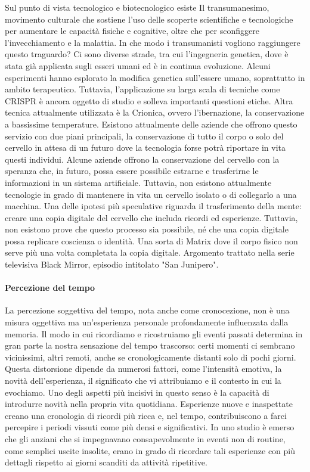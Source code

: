\documentclass[12pt]{book} %
\begin{document}
Sul punto di vista tecnologico e biotecnologico esiste Il transumanesimo, movimento culturale che sostiene l'uso delle scoperte scientifiche e tecnologiche per aumentare le capacità fisiche e cognitive, oltre che per sconfiggere l'invecchiamento e la
malattia. In che modo i transumanisti vogliono raggiungere questo traguardo? Ci sono diverse strade, tra cui
l'ingegneria genetica, dove è stata già applicata sugli esseri umani ed è in continua evoluzione.
Alcuni esperimenti hanno esplorato la modifica genetica sull’essere umano, soprattutto in ambito terapeutico. Tuttavia, l’applicazione su larga scala di tecniche come CRISPR è ancora oggetto di studio e solleva importanti questioni etiche. Altra tecnica attualmente utilizzata è la
Crionica, ovvero l'ibernazione, la conservazione a bassissime temperature. Esistono attualmente
delle aziende che offrono questo servizio con due piani principali, la conservazione di tutto il corpo o solo del
cervello in attesa di un futuro dove la tecnologia forse potrà riportare in vita questi individui. Alcune aziende offrono la conservazione del cervello con la speranza che, in futuro, possa essere possibile estrarne e trasferirne le informazioni in un sistema artificiale. Tuttavia, non esistono attualmente tecnologie in grado di mantenere in vita un cervello isolato o di collegarlo a una macchina. Una delle ipotesi più speculative riguarda il trasferimento della mente: creare una copia digitale del cervello che includa ricordi ed esperienze. Tuttavia, non esistono prove che questo processo sia possibile, né che una copia digitale possa replicare coscienza o identità. Una sorta di Matrix dove il corpo fisico non serve più una
volta completata la copia digitale. Argomento trattato nella serie televisiva Black Mirror, episodio intitolato "San Junipero".

\paragraph{Percezione del tempo}

La percezione soggettiva del tempo, nota anche come cronocezione, non è una misura oggettiva ma un’esperienza personale profondamente influenzata dalla memoria. Il modo in cui ricordiamo e ricostruiamo gli eventi passati determina in gran parte la nostra sensazione del tempo trascorso: certi momenti ci sembrano vicinissimi, altri remoti, anche se cronologicamente distanti solo di pochi giorni. Questa distorsione dipende da numerosi fattori, come l’intensità emotiva, la novità dell’esperienza, il significato che vi attribuiamo e il contesto in cui la evochiamo.
Uno degli aspetti più incisivi in questo senso è la capacità di introdurre novità nella propria vita quotidiana. Esperienze nuove e inaspettate creano una cronologia di ricordi più ricca  e, nel tempo, contribuiscono a farci percepire i periodi vissuti come più densi e significativi. In uno studio è emerso che gli anziani che si impegnavano consapevolmente in eventi non di routine, come semplici uscite insolite, erano in grado di ricordare tali esperienze con più dettagli rispetto ai giorni scanditi da attività ripetitive. 
\end{document}
